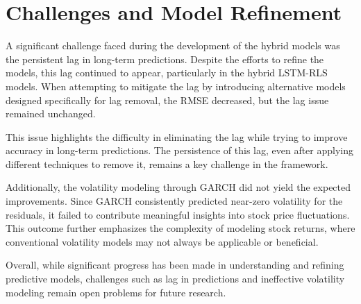 \section{Challenges and Model Refinement}
A significant challenge faced during the development of the hybrid models was the persistent lag in long-term predictions. Despite the efforts to refine the models, this lag continued to appear, particularly in the hybrid LSTM-RLS models. When attempting to mitigate the lag by introducing alternative models designed specifically for lag removal, the RMSE decreased, but the lag issue remained unchanged.

This issue highlights the difficulty in eliminating the lag while trying to improve accuracy in long-term predictions. The persistence of this lag, even after applying different techniques to remove it, remains a key challenge in the framework.

Additionally, the volatility modeling through GARCH did not yield the expected improvements. Since GARCH consistently predicted near-zero volatility for the residuals, it failed to contribute meaningful insights into stock price fluctuations. This outcome further emphasizes the complexity of modeling stock returns, where conventional volatility models may not always be applicable or beneficial.

Overall, while significant progress has been made in understanding and refining predictive models, challenges such as lag in predictions and ineffective volatility modeling remain open problems for future research.

